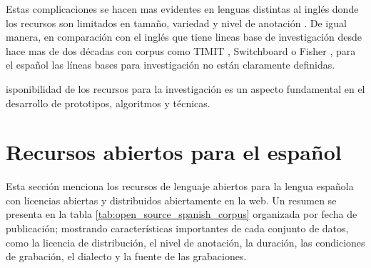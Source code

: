 Estas complicaciones se hacen mas evidentes en lenguas distintas al inglés donde  los recursos son limitados en tamaño, variedad y nivel de anotación \cite{HernndezMena2017}. De igual manera, en comparación con el inglés que  tiene lineas base de investigación desde hace mas de dos décadas con corpus como TIMIT \cite{TIMIT}, Switchboard \cite{Switchboard} o Fisher \cite{Fisher}, para el español las líneas bases para investigación no están claramente definidas.

isponibilidad de los recursos para la investigación es un aspecto fundamental en el desarrollo de prototipos, algoritmos y técnicas. 





\section{Recursos abiertos para el español}

Esta sección menciona los recursos de lenguaje abiertos para la lengua española con licencias abiertas y distribuidos abiertamente en la web. Un resumen se presenta en la tabla \ref{tab:open_source_spanish_corpus} organizada por fecha de publicación; mostrando características importantes de cada conjunto de datos, como la licencia de distribución, el nivel de anotación, la duración, las condiciones de grabación, el dialecto y la fuente de las grabaciones.

